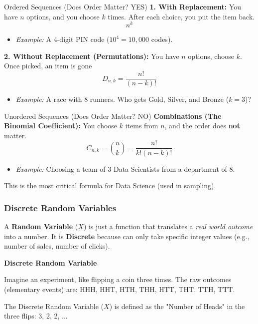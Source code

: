 \begin{defbox}{Ordered Sequences (Does Order Matter? YES)}
\textbf{1. With Replacement:}
You have $n$ options, and you choose $k$ times. After each choice, you put the item back.
\begin{equation}
n^k
\end{equation}
\begin{itemize}
    \item \textit{Example:} A 4-digit PIN code ($10^4 = 10,000$ codes).
\end{itemize}

\vs
\textbf{2. Without Replacement (Permutations):}
You have $n$ options, choose $k$. Once picked, an item is gone
\begin{equation}
D_{n,k} = \frac{n!}{(n-k)!}
\end{equation}
\begin{itemize}
    \item \textit{Example:} A race with 8 runners. Who gets Gold, Silver, and Bronze ($k=3$)?

\end{itemize}
\end{defbox}

\begin{defbox}{Unordered Sequences (Does Order Matter? NO)}
\textbf{Combinations (The Binomial Coefficient):}
You choose $k$ items from $n$, and the order does \textbf{not} matter.
    \begin{equation}
        C_{n,k} = \binom{n}{k} = \frac{n!}{k!(n-k)!}
    \end{equation}
\begin{itemize}
    \item \textit{Example:} Choosing a team of 3 Data Scientists from a department of 8.
\end{itemize}
\end{defbox}

This is the most critical formula for Data Science (used in sampling).

\subsubsection{Discrete Random Variables}

A \textbf{Random Variable} ($X$) is just a function that translates a \textit{real world outcome} into a number. It is \textbf{Discrete} because can only take specific integer values (e.g., number of sales, number of clicks).


\pagebreak
\begin{example}{\textbf{Discrete Random Variable}}

  Imagine an experiment, like flipping a coin three times. The raw outcomes (elementary events) are: {HHH, HHT, HTH, THH, HTT, THT, TTH, TTT}.
  
  \vs
  The Discrete Random Variable ($X$) is defined as the "Number of Heads" in the three flips: 3, 2, 2, ...  
\end{example}

